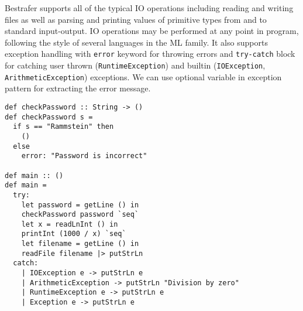 \documentclass[declaration,shortabstract,english]{iithesis}
\begin{document}
Bestrafer supports all of the typical IO operations including reading and writing files as well as
parsing and printing values of primitive types from and to standard input-output.
IO operations may be performed at any point in program, following the style of
several languages in the ML family. It also supports exception handling with \verb+error+
keyword for throwing errors and \verb+try-catch+ block for catching
user thrown (\verb+RuntimeException+) and builtin (\verb+IOException+,
\verb+ArithmeticException+) exceptions. We can use optional variable in exception pattern
for extracting the error message.
\begin{verbatim}
def checkPassword :: String -> ()
def checkPassword s =
  if s == "Rammstein" then
    ()
  else
    error: "Password is incorrect"

def main :: ()
def main =
  try:
    let password = getLine () in
    checkPassword password `seq`
    let x = readLnInt () in
    printInt (1000 / x) `seq`
    let filename = getLine () in
    readFile filename |> putStrLn
  catch:
    | IOException e -> putStrLn e
    | ArithmeticException -> putStrLn "Division by zero"
    | RuntimeException e -> putStrLn e
    | Exception e -> putStrLn e
\end{verbatim}
\end{document}
